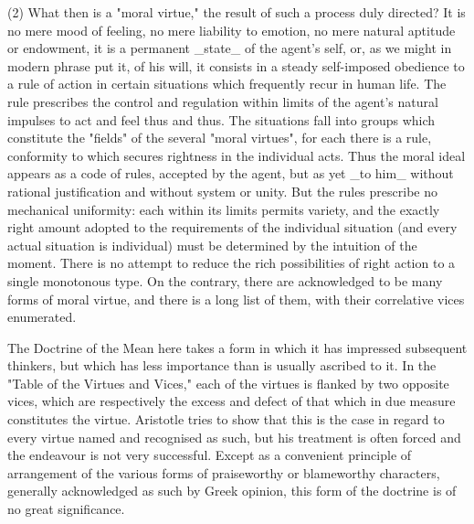 (2) What then is a "moral virtue," the result of such a process duly
directed? It is no mere mood of feeling, no mere liability to emotion,
no mere natural aptitude or endowment, it is a permanent _state_ of the
agent's self, or, as we might in modern phrase put it, of his will,
it consists in a steady self-imposed obedience to a rule of action
in certain situations which frequently recur in human life. The rule
prescribes the control and regulation within limits of the agent's
natural impulses to act and feel thus and thus. The situations fall into
groups which constitute the "fields" of the several "moral virtues",
for each there is a rule, conformity to which secures rightness in
the individual acts. Thus the moral ideal appears as a code of
rules, accepted by the agent, but as yet _to him_ without rational
justification and without system or unity. But the rules prescribe no
mechanical uniformity: each within its limits permits variety, and the
exactly right amount adopted to the requirements of the individual
situation (and every actual situation is individual) must be determined
by the intuition of the moment. There is no attempt to reduce the rich
possibilities of right action to a single monotonous type. On the
contrary, there are acknowledged to be many forms of moral virtue, and
there is a long list of them, with their correlative vices enumerated.

The Doctrine of the Mean here takes a form in which it has impressed
subsequent thinkers, but which has less importance than is usually
ascribed to it. In the "Table of the Virtues and Vices," each of the
virtues is flanked by two opposite vices, which are respectively the
excess and defect of that which in due measure constitutes the virtue.
Aristotle tries to show that this is the case in regard to every virtue
named and recognised as such, but his treatment is often forced and the
endeavour is not very successful. Except as a convenient principle
of arrangement of the various forms of praiseworthy or blameworthy
characters, generally acknowledged as such by Greek opinion, this form
of the doctrine is of no great significance.

